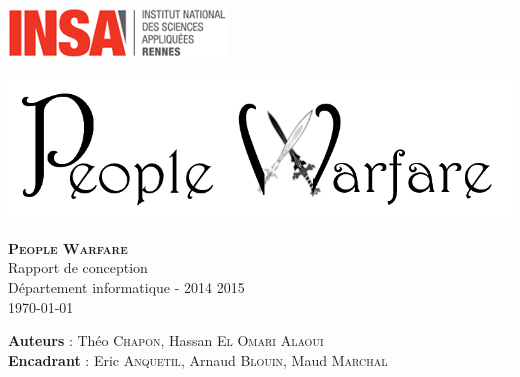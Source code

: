 \documentclass[a4paper,11pt]{article}
\begin{document}
  

\begin{titlepage}
\begin{minipage}[t]{0.5\textwidth}
\begin{flushleft}
\centering
\hspace{-5cm}
\includegraphics[width=\textwidth]{fig/logoINSA}
\end{flushleft}
\end{minipage}
\begin{minipage}[t]{0.5\textwidth}
\begin{flushright}
\centering
\includegraphics[width=\textwidth]{fig/logo}
\end{flushright}
\end{minipage}
\vspace{8cm}
\begin{center}
\textsc{\LARGE \bfseries People Warfare}\\[0.25cm]
		{\LARGE Rapport de conception}\\[0.25cm]
{  \Large Département informatique - 2014 2015}\\[2cm]
\Large \today
\vspace{4cm}
\begin{minipage}[t]{\textwidth}
\begin{flushleft} \large
\vspace{3cm}
\textbf{Auteurs} :
        Théo \textsc{Chapon},
        Hassan \textsc{El Omari Alaoui} 
        \\
\textbf{Encadrant} :
 Eric \textsc{Anquetil},
 Arnaud \textsc{Blouin},
 Maud \textsc{Marchal}
\end{flushleft}
\end{minipage}
\end{center}



 \end{titlepage} 
\end{document}
